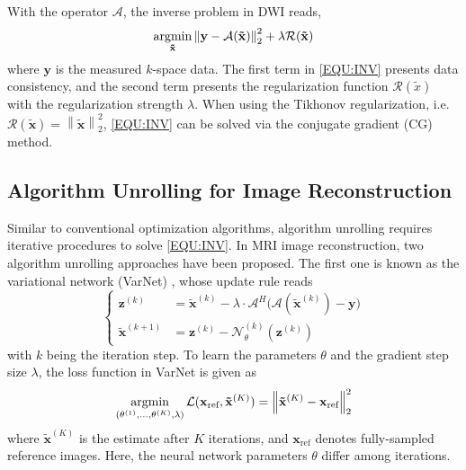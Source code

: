 \documentclass[journal,twoside,web]{ieeecolor}
\newcommand{\argmin}{\operatornamewithlimits{argmin}}
\newcommand{\norm}[1]{\left\lVert#1\right\rVert}
\begin{document}
	With the operator $\mathcal{A}$, the inverse problem in DWI reads,
	\begin{equation}
		\argmin_{\mathbf{\tilde{x}}} \norm{\mathbf{y} - \mathcal{A}(\mathbf{\tilde{x}})}_2^2 + \lambda \mathcal{R}(\mathbf{\tilde{x}})
		\label{EQU:INV}
	\end{equation}
	where $\mathbf{y}$ is the measured $k$-space data.
    The first term in \cref{EQU:INV} presents data consistency, and
    the second term presents the regularization function $\mathcal{R}(\tilde{x})$
	with the regularization strength $\lambda$.
	When using the Tikhonov regularization,
	i.e.~$\mathcal{R}(\mathbf{\tilde{x}}) = \norm{\mathbf{\tilde{x}}}_2^2$,
	\cref{EQU:INV} can be solved via the conjugate gradient (CG) method.


	\subsection{Algorithm Unrolling for Image Reconstruction}


    Similar to conventional optimization algorithms,
    algorithm unrolling requires iterative procedures
    to solve \cref{EQU:INV}. In MRI image reconstruction,
    two algorithm unrolling approaches have been proposed.
    The first one is known as the variational network (VarNet)
    \cite{hammernik_2018_varnet}, whose update rule reads
    \begin{equation} \label{EQU:VarNet_Upd}
        \left\{\begin{aligned}
            \mathbf{z}^{(k)} &= \mathbf{\tilde{x}}^{(k)} - \lambda \cdot \mathcal{A}^H \Big( \mathcal{A} (\mathbf{\tilde{x}}^{(k)}) - \mathbf{y} \Big) \\
            \mathbf{\tilde{x}}^{(k+1)} &= \mathbf{z}^{(k)} - \mathcal{N}_{\theta}^{(k)} (\mathbf{z}^{(k)})
        \end{aligned}\right.
    \end{equation}
    with $k$ being the iteration step.
    To learn the parameters $\theta$ and the gradient step size $\lambda$,
    the loss function in VarNet is given as
    \begin{equation}
        \argmin_{(\theta^{(1)}, \ldots, \theta^{(K)}, \lambda)} \mathcal{L} (\mathbf{x}_{\text{ref}}, \mathbf{\tilde{x}}^{(K)}) = \norm{\mathbf{\tilde{x}}^{(K)} - \mathbf{x}_{\text{ref}}}_2^2
        \label{EQU:VarNet_Loss}
    \end{equation}
    where $\mathbf{\tilde{x}}^{(K)}$ is the estimate after $K$ iterations,
    and $\mathbf{x}_{\text{ref}}$ denotes fully-sampled reference images.
    Here, the neural network parameters $\theta$
    differ among iterations.
\end{document}
